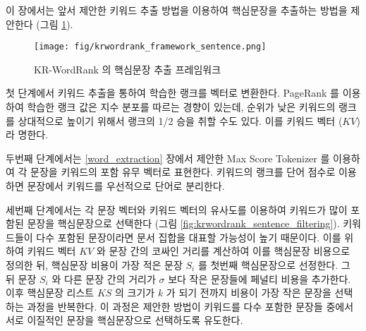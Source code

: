 \documentclass[oneside, ko,phd]{snuthesis_utf8_kor}
\begin{document}
이 장에서는 앞서 제안한 키워드 추출 방법을 이용하여 핵심문장을 추출하는 방법을 제안한다 (그림 \ref{fig:krwordrank_framework_sentence}).

\begin{figure}[H]
\centering
\texttt{[image: fig/krwordrank\_framework\_sentence.png]}
\caption{KR-WordRank 의 핵심문장 추출 프레임워크}
\label{fig:krwordrank_framework_sentence}
\end{figure}

첫 단계에서 키워드 추출을 통하여 학습한 랭크를 벡터로 변환한다.
PageRank 를 이용하여 학습한 랭크 값은 지수 분포를 따르는 경향이 있는데, 순위가 낮은 키워드의 랭크를 상대적으로 높이기 위해서 랭크의 1/2 승을 취할 수도 있다.
이를 키워드 벡터 ($KV$) 라 명한다.

두번째 단계에서는 \ref{word_extraction} 장에서 제안한 Max Score Tokenizer 를 이용하여 각 문장을 키워드의 포함 유무 벡터로 표현한다.
키워드의 랭크를 단어 점수로 이용하면 문장에서 키워드를 우선적으로 단어로 분리한다.

세번째 단계에서는 각 문장 벡터와 키워드 벡터의 유사도를 이용하여 키워드가 많이 포함된 문장을 핵심문장으로 선택한다 (그림 \ref{fig:krwordrank_sentence_filtering}).
키워드들이 다수 포함된 문장이라면 문서 집합을 대표할 가능성이 높기 때문이다.
이를 위하여 키워드 벡터 $KV$ 와 문장 간의 코싸인 거리를 계산하여 이를 핵심문장 비용으로 정의한 뒤, 핵심문장 비용이 가장 적은 문장 $S_i$ 를 첫번째 핵심문장으로 선정한다.
그 뒤 문장 $S_i$ 와 다른 문장 간의 거리가 $\sigma$ 보다 작은 문장들에 페널티 비용을 추가한다.
이후 핵심문장 리스트 $KS$ 의 크기가 $k$ 가 되기 전까지 비용이 가장 작은 문장을 선택하는 과정을 반복한다.
이 과정은 제안한 방법이 키워드를 다수 포함한 문장들 중에서 서로 이질적인 문장을 핵심문장으로 선택하도록 유도한다.
\end{document}
